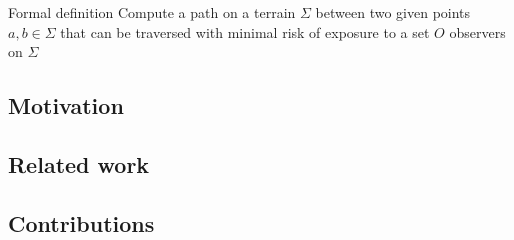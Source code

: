 \begin{frame}{Formal definition}
	\centering
	\Large
	Compute a path on a terrain $\Sigma$ between two given points $a, b \in \Sigma$ that can be traversed with minimal risk of exposure to a set $O$ observers on $\Sigma$

\end{frame}

\subsection{Motivation}


\subsection{Related work}


\subsection{Contributions}


